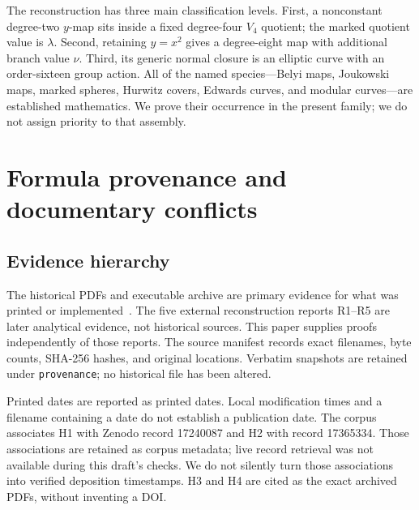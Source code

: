 The reconstruction has three main classification levels. First, a nonconstant degree-two \(y\)-map sits inside a fixed degree-four \(V_4\) quotient; the marked quotient value is \(\lambda\). Second, retaining \(y=x^2\) gives a degree-eight map with additional branch value \(\nu\). Third, its generic normal closure is an elliptic curve with an order-sixteen group action. All of the named species---Belyi maps, Joukowski maps, marked spheres, Hurwitz covers, Edwards curves, and modular curves---are established mathematics. We prove their occurrence in the present family; we do not assign priority to that assembly.

\section{Formula provenance and documentary conflicts}\label{sec:history}

\subsection{Evidence hierarchy}
The historical PDFs and executable archive are primary evidence for what was printed or implemented~\cite{H1,H2,H3,H4}. The five external reconstruction reports R1--R5 are later analytical evidence, not historical sources. This paper supplies proofs independently of those reports. The source manifest records exact filenames, byte counts, SHA-256 hashes, and original locations. Verbatim snapshots are retained under \texttt{provenance}; no historical file has been altered.

Printed dates are reported as printed dates. Local modification times and a filename containing a date do not establish a publication date. The corpus associates H1 with Zenodo record 17240087 and H2 with record 17365334. Those associations are retained as corpus metadata; live record retrieval was not available during this draft's checks. We do not silently turn those associations into verified deposition timestamps. H3 and H4 are cited as the exact archived PDFs, without inventing a DOI.

